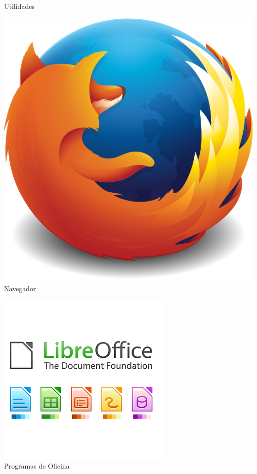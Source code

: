 \documentclass[hyperref={colorlinks}]{beamer}
\begin{document}
\begin{frame}
\begin{minipage}[b][.30\textheight][t]{.24\textwidth}
	    \centering Utilidades 
    \end{minipage}
    \vspace{.10\textheight}
    \begin{minipage}[b][.30\textheight][t]{.24\textwidth}
	    \includegraphics[width=.7\textwidth]{figs/firefox.pdf}\\
	    \centering Navegador
    \end{minipage}
    \begin{minipage}[b][.30\textheight][t]{.24\textwidth}
	    \includegraphics[width=.7\textwidth]{figs/libreoffice.png}\\
	    \centering Programas de Oficina
    \end{minipage}
\end{frame}
\end{document}
